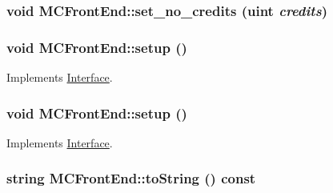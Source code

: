 \hypertarget{classMCFrontEnd_eb0cc4a818d1a8dd1cdc071da8519628}{
\subsubsection[{set\_\-no\_\-credits}]{\setlength{\rightskip}{0pt plus 5cm}void MCFrontEnd::set\_\-no\_\-credits ({\bf uint} {\em credits})}}
\label{classMCFrontEnd_eb0cc4a818d1a8dd1cdc071da8519628}


\hypertarget{classMCFrontEnd_5f399666cb967c146570e81372fe6be6}{
\subsubsection[{setup}]{\setlength{\rightskip}{0pt plus 5cm}void MCFrontEnd::setup ()}}
\label{classMCFrontEnd_5f399666cb967c146570e81372fe6be6}




Implements \hyperlink{classInterface_f9015204e6dabe3e0fce572b19cd1550}{Interface}.\hypertarget{classMCFrontEnd_5f399666cb967c146570e81372fe6be6}{
\subsubsection[{setup}]{\setlength{\rightskip}{0pt plus 5cm}void MCFrontEnd::setup ()}}
\label{classMCFrontEnd_5f399666cb967c146570e81372fe6be6}




Implements \hyperlink{classInterface_f9015204e6dabe3e0fce572b19cd1550}{Interface}.\hypertarget{classMCFrontEnd_9dda980a7ae732e6cb6da7121bc4f539}{
\subsubsection[{toString}]{\setlength{\rightskip}{0pt plus 5cm}string MCFrontEnd::toString () const}}
\label{classMCFrontEnd_9dda980a7ae732e6cb6da7121bc4f539}




